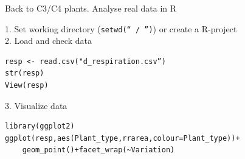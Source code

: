 \documentclass[10pt]{beamer}
\makeatletter
\newenvironment{kframe}{%
 \def\at@end@of@kframe{}%
 \ifinner\ifhmode%
  \def\at@end@of@kframe{\end{minipage}}%
  \begin{minipage}{\columnwidth}%
 \fi\fi%
 \def\FrameCommand##1{\hskip\@totalleftmargin \hskip-\fboxsep
 \colorbox{shadecolor}{##1}\hskip-\fboxsep
     \hskip-\linewidth \hskip-\@totalleftmargin \hskip\columnwidth}%
 \MakeFramed {\advance\hsize-\width
   \@totalleftmargin\z@ \linewidth\hsize
   \@setminipage}}%
 {\par\unskip\endMakeFramed%
 \at@end@of@kframe}
\newenvironment{knitrout}{}{} %
\makeatother
\begin{document}
\begin{frame}[fragile]{Back to C3/C4 plants. Analyse real data in R}

1. Set working directory (\texttt{setwd(`` / '')}) or create a R-project\\

2. Load and check data
\begin{knitrout}
\color{fgcolor}\begin{kframe}
\begin{verbatim}
resp <- read.csv("d_respiration.csv”)
str(resp)
View(resp)
\end{verbatim}
\end{kframe}
\end{knitrout}

3. Visualize data
\begin{knitrout}
\color{fgcolor}\begin{kframe}
\begin{verbatim}
library(ggplot2)
ggplot(resp,aes(Plant_type,rrarea,colour=Plant_type))+
    geom_point()+facet_wrap(~Variation)
\end{verbatim}
\end{kframe}
\end{knitrout}

\end{frame}
\end{document}
